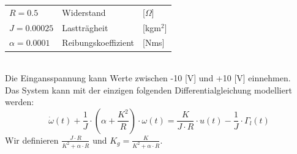 \begin{aufgabe}
\begin{tabular}{@{}lll}
        $R = 0.5$           & Widerstand                        & [$\Omega$] \\
        $J = 0.00025$       & Lastträgheit                      & [kgm$^2$] \\
        $\alpha = 0.0001$   & Reibungskoeffizient               & [Nms] \\
    \end{tabular}
    \\
    Die Eingansspannung kann Werte zwischen -10 [V] und +10 [V] einnehmen. \\
    Das System kann mit der einzigen folgenden Differentialgleichung modelliert werden:
    \[ \dot{\omega}(t) 
        + \frac{1}{J} \cdot \left(\alpha + \frac{K^2}{R}\right) \cdot \omega(t) 
        = \frac{K}{J \cdot R} \cdot u(t) - \frac{1}{J} \cdot \Gamma_l(t)
    \]
    Wir definieren $\frac{J \cdot R}{K^2 + \alpha \cdot R}$ und 
    $K_g = \frac{K}{K^2 + \alpha \cdot R}$. 
\end{aufgabe}

